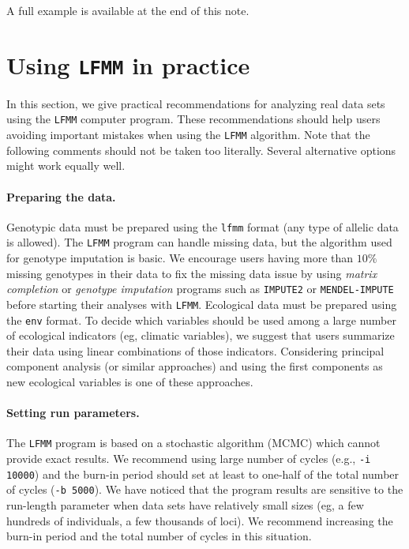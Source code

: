 \documentclass[10pt,a4paper]{article}
\begin{document}
\noindent
A full example is available at the end of this note.

\section{Using {\tt LFMM} in practice}

In this section, we give practical recommendations for analyzing real data sets using the {\tt LFMM} computer program. These recommendations should help users avoiding important mistakes when using the {\tt LFMM} algorithm. Note that the following comments should not be taken too literally. Several alternative options might work equally well. 

\paragraph{Preparing the data.} Genotypic data must be prepared using the {\tt lfmm} format (any type of allelic data is allowed). The {\tt LFMM} program can handle missing data, but the algorithm used for genotype imputation is basic. We encourage users having more than $10\%$ missing genotypes in their data to fix the missing data issue by using {\it matrix completion} or {\it genotype imputation} programs such as {\tt IMPUTE2} or {\tt MENDEL-IMPUTE} before starting their analyses with {\tt LFMM}. 
Ecological data must be prepared using the {\tt env} format. To decide which variables should be used among a large number of ecological indicators (eg, climatic variables), we suggest that users summarize their data using linear combinations of those indicators.  Considering principal component analysis (or similar approaches) and using the first components as new ecological variables is one of these approaches.

\paragraph{Setting run parameters.}  The {\tt LFMM} program is based on a stochastic algorithm (MCMC) which cannot provide exact results. We recommend using large number of cycles (e.g., {\tt -i 10000}) and the burn-in period should set at least to one-half of the total number of cycles ({\tt -b 5000}). We have noticed that the program results are sensitive to the run-length parameter when data sets have relatively small sizes (eg, a few hundreds of individuals, a few thousands of loci). We recommend increasing  the burn-in period and the total number of cycles in this situation.        
\end{document}
